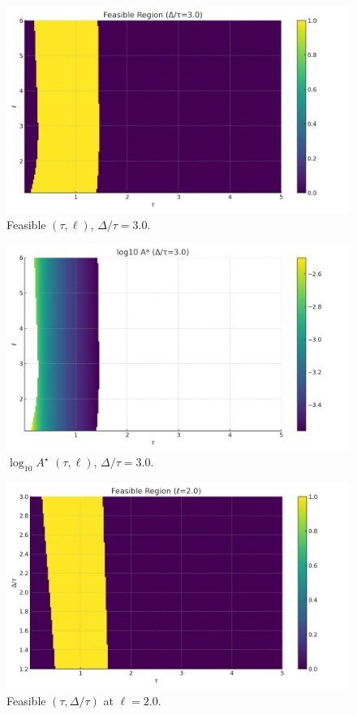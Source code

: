 \documentclass[11pt]{article}
\begin{document}
\begin{figure}[h]\centering\includegraphics[width=0.85\linewidth]{figures/sweeps/feasible_tau_l_dratio_3.0.png}\caption{Feasible $(\tau,\ell)$, $\Delta/\tau=3.0$.}\end{figure}
\begin{figure}[h]\centering\includegraphics[width=0.85\linewidth]{figures/sweeps/Astar_tau_l_dratio_3.0.png}\caption{$\log_{10}A^\star$ $(\tau,\ell)$, $\Delta/\tau=3.0$.}\end{figure}
\begin{figure}[h]\centering\includegraphics[width=0.85\linewidth]{figures/sweeps/feasible_tau_dratio_l2.0.png}\caption{Feasible $(\tau,\Delta/\tau)$ at $\ell=2.0$.}\end{figure}
\end{document}
